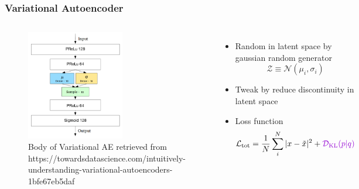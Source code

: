 \documentclass{beamer}
\begin{document}
\begin{frame}
\frametitle{Variational Autoencoder}
\begin{columns}
    \begin{figure}
        \includegraphics[height=0.6\textheight, width=0.6\textwidth]{images/variational_ae}
        \caption{Body of Variational AE \tiny retrieved from https://towardsdatascience.com/intuitively-understanding-variational-autoencoders-1bfe67eb5daf}
    \end{figure}

    \begin{itemize}
        \item Random  in latent space by gaussian random generator
        \begin{equation}
            \mathcal{Z} \equiv \mathcal{N}(\mu_i, \sigma_i)
        \end{equation}
        \item Tweak by \textcolor[RGB]{148,0,211}{reduce discontinuity in latent space}
        \item Loss function
        \begin{equation}
            \mathcal{L}_{\text{tot}} = \frac{1}{N}\sum_i^N |x-\tilde{x}|^2 + \textcolor[RGB]{148,0,211}{\mathcal{D}_{\text{KL}}(p|q)}
        \end{equation}
    \end{itemize}
\end{columns}
\end{frame}
\end{document}
